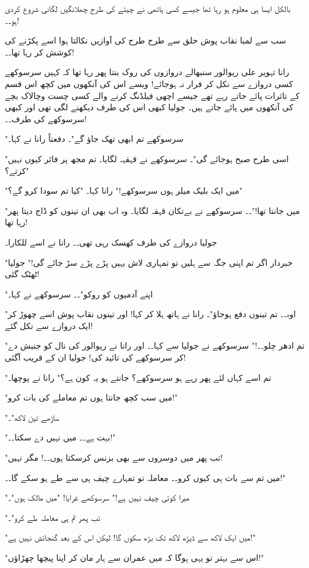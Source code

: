 بالکل ایسا ہی معلوم ہو رہا تھا جیسے کسی ہاتھی نے چیتے کی طرح چھلانگیں لگانی شروع کردی ہو۔۔!

سب سے لمبا نقاب پوش حلق سے طرح طرح کی آوازیں نکالتا ہوا اسے پکڑنے کی کوشش کر رہا تھا۔۔!

رانا تہویر علی ریوالور سنبھالے دروازوں کی روک بنتا پھر رہا تھا کہ کہیں سرسوکھے کسی دروازے سے نکل کر فرار نہ ہوجائے! ویسے اس کی آنکھوں میں کچھ اس قسم کے تاثرات پائے جاتے رہے تھے جیسے اچھی فیلڈنگ کرنے والے کسی چست وچالاک بچے کی آنکھوں میں پائے جاتے ہیں۔ جولیا کبھی اس کی طرف دیکھنے لگی تھی اور کبھی سرسوکھے کی طرف۔۔!

"سرسوکھے تم ابھی تھک جاؤ گے"۔ دفعتاً رانا نے کہا۔

"اسی طرح صبح ہوجائے گی"۔ سرسوکھے نے قہقہہ لگایا۔ تم مجھ پر فائر کیوں نہیں کرتے؟"

"میں ایک بلیک میلر ہوں سرسوکھے!" رانا کہا۔ "کیا تم سودا کرو گے؟"

"میں جانتا تھا!"۔۔ سرسوکھے نے بےتکان قہقہ لگایا۔ وہ اب بھی ان تینوں کو ڈاج دیتا پھر رہا تھا!

جولیا دروازے کی طرف کھسک رہی تھی۔۔ رانا نے اسے للکارا۔

"خبردار اگر تم اپنی جگہ سے ہلیں تو تمہاری لاش یہیں پڑے پڑے سڑ جائے گی!" جولیا ٹھٹک گئی!

"اپنے آدمیوں کو روکو"۔۔ سرسوکھے نے کہا۔

"اوہ۔۔ تم تینوں دفع ہوجاؤ"۔ رانا نے ہاتھ ہلا کر کہا! اور تینوں نقاب پوش اسے چھوڑ کر ایک دروازے سے نکل گئے!

"تم ادھر چلو۔۔!" سرسوکھے نے جولیا سے کہا۔۔ اور رانا نے ریوالور کی نال کو جنبش دے کر سرسوکھے کی تائید کی! جولیا ان کے قریب آگئی!

"تم اسے کہاں لئے پھر رہے ہو سرسوکھے؟ جانتے ہو یہ کون ہے؟" رانا نے پوچھا۔

"میں سب کچھ جانتا ہوں تم معاملے کی بات کرو!"

"ساڑھے تین لاکھ"۔

"بہت ہے۔۔ میں نہیں دے سکتا۔۔!"

"تب پھر میں دوسروں سے بھی بزنس کرسکتا ہوں۔۔! مگر نہیں!

میں تم سے بات ہی کیوں کرو۔۔ معاملہ تو تمہارے چیف ہی سے طے ہو سکے گا۔۔!"

"میرا کوئی چیف نہیں ہے!" سرسوکھے غرایا! "میں مالک ہوں"۔

"تب پھر تم ہی معاملہ طے کرو"۔

"میں ایک لاکھ سے ڈیڑھ لاکھ تک بڑھ سکوں گا! لیکن اس کے بعد گنجائش نہیں ہے!"

"اس سے بہتر تو یہی ہوگا کہ میں عمران سے ہار مان کر اپنا پیچھا چھڑاؤں!"


